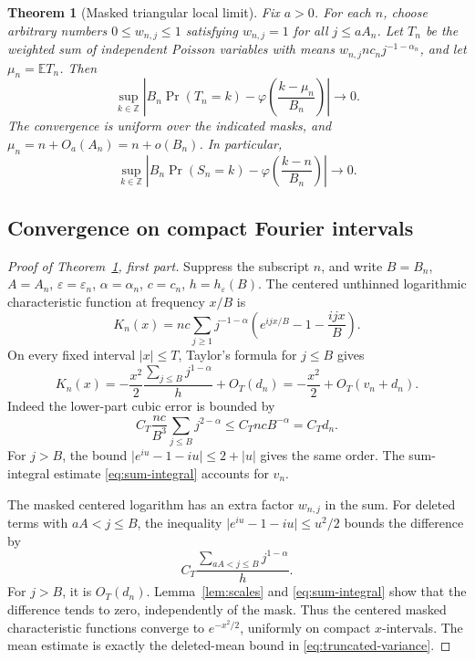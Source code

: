 \documentclass[11pt,a4paper]{article}
\numberwithin{equation}{section}
\newtheorem{theorem}{Theorem}[section]
\theoremstyle{definition}
\theoremstyle{remark}
\newcommand{\Z}{\mathbb Z}
\newcommand{\E}{\mathbb E}
\newcommand{\eps}{\varepsilon}
\newcommand{\ph}{\varphi}
\begin{document}
\begin{theorem}[Masked triangular local limit]
\label{thm:masked-llt}
Fix \(a>0\). For each \(n\), choose arbitrary numbers
\(0\le w_{n,j}\le1\) satisfying \(w_{n,j}=1\) for all \(j\le aA_n\).
Let \(T_n\) be the weighted sum of independent Poisson variables with means
\(w_{n,j}nc_nj^{-1-\alpha_n}\), and let \(\mu_n=\E T_n\). Then
\begin{equation}
 \sup_{k\in\Z}\left|
 B_n\Pr(T_n=k)-\ph\left(\frac{k-\mu_n}{B_n}\right)
 \right|\longrightarrow0.
 \label{eq:masked-llt}
\end{equation}
The convergence is uniform over the indicated masks, and
\(\mu_n=n+O_a(A_n)=n+o(B_n)\). In particular,
\begin{equation}
 \sup_{k\in\Z}\left|
 B_n\Pr(S_n=k)-\ph\left(\frac{k-n}{B_n}\right)
 \right|\longrightarrow0.
 \label{eq:llt}
\end{equation}
\end{theorem}

\subsection{Convergence on compact Fourier intervals}
\begin{proof}[Proof of Theorem~\ref{thm:masked-llt}, first part]
Suppress the subscript \(n\), and write \(B=B_n\), \(A=A_n\),
\(\eps=\eps_n\), \(\alpha=\alpha_n\), \(c=c_n\), \(h=h_\eps(B)\).
The centered unthinned logarithmic characteristic function at frequency
\(x/B\) is
\begin{equation}
 K_n(x)=nc\sum_{j\ge1}j^{-1-\alpha}
        \left(e^{ijx/B}-1-\frac{ijx}{B}\right).
 \label{eq:K}
\end{equation}
On every fixed interval \(|x|\le T\), Taylor's formula for \(j\le B\) gives
\begin{equation}
 K_n(x)=-\frac{x^2}{2}\frac{\sum_{j\le B}j^{1-\alpha}}h+O_T(d_n)
       =-\frac{x^2}{2}+O_T(v_n+d_n).
 \label{eq:K-compact}
\end{equation}
Indeed the lower-part cubic error is bounded by
\[
 C_T\frac{nc}{B^3}\sum_{j\le B}j^{2-\alpha}
 \le C_TncB^{-\alpha}=C_Td_n.
\]
For \(j>B\), the bound
\(\lvert e^{iu}-1-iu\rvert\le2+|u|\) gives the same order. The sum-integral
estimate \eqref{eq:sum-integral} accounts for \(v_n\).

The masked centered logarithm has an extra factor \(w_{n,j}\) in the sum.
For deleted terms with \(aA<j\le B\), the inequality
\(\lvert e^{iu}-1-iu\rvert\le u^2/2\) bounds the difference by
\[
 C_T\frac{\sum_{aA<j\le B}j^{1-\alpha}}h.
\]
For \(j>B\), it is \(O_T(d_n)\). Lemma~\ref{lem:scales} and
\eqref{eq:sum-integral} show that the difference tends to zero, independently
of the mask. Thus the centered masked characteristic functions converge to
\(e^{-x^2/2}\), uniformly on compact \(x\)-intervals. The mean estimate is
exactly the deleted-mean bound in \eqref{eq:truncated-variance}.
\end{proof}
\end{document}
